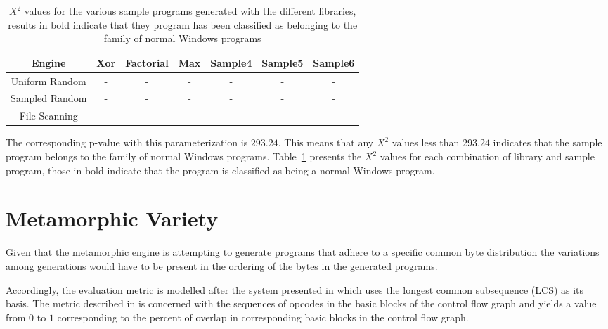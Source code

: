 \documentclass[finalcopy,short]{srpaper}
\begin{document}
        \begin{table}
            \centering
            \begin{tabular}{|c||c|c|c|c|c|c|}
                \hline
                Engine & Xor & Factorial & Max & Sample4 & Sample5 & Sample6 \\
                \hline
                Uniform Random & - & - & - & - & - & - \\
                \hline
                Sampled Random & - & - & - & - & - & - \\
                \hline
                File Scanning & - & - & - & - & - & - \\
                \hline
            \end{tabular}
            \caption{$X^2$ values for the various sample programs generated with
            the different libraries, results in bold indicate that they program
            has been classified as belonging to the family of normal Windows
            programs}
            \label{tab:results-windows-like}
        \end{table}

        The corresponding p-value with this parameterization is $293.24$. This
        means that any $X^2$ values less than $293.24$ indicates that the sample
        program belongs to the family of normal Windows programs.
        Table~\ref{tab:results-windows-like} presents the $X^2$ values for each
        combination of library and sample program, those in bold indicate that
        the program is classified as being a normal Windows program.


    \section{Metamorphic Variety}
        
        Given that the metamorphic engine is attempting to generate programs
        that adhere to a specific common byte distribution the variations among
        generations would have to be present in the ordering of the bytes in the
        generated programs. 

        Accordingly, the evaluation metric is modelled after the system
        presented in \cite{cfg_lcs} which uses the longest common subsequence
        (LCS) as its basis. The metric described in \cite{cfg_lcs} is concerned
        with the sequences of opcodes in the basic blocks of the control flow
        graph and yields a value from $0$ to $1$ corresponding to the percent of
        overlap in corresponding basic blocks in the control flow graph.
        
\end{document}
